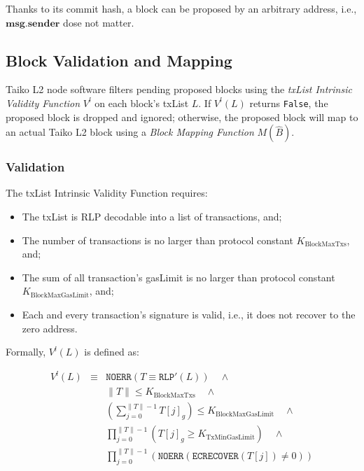 \documentclass[9pt,oneside]{amsart}
\begin{document}
\begin{multicols}{2}
Thanks to its commit hash, a block can be proposed by an arbitrary address, i.e., $\mathbf{msg.sender}$ dose not matter.

\subsection{Block Validation and Mapping } \label{sec:filtermap}
Taiko L2 node software filters pending proposed blocks using the \textit{txList Intrinsic Validity Function} $V^l$ on each block's txList $L$. If $V^l(L)$ returns \texttt{False}, the proposed block is dropped and ignored; otherwise, the proposed block will map to an actual Taiko L2 block using a \textit{Block Mapping Function} $M(\hat{B})$.

\subsubsection{Validation} The txList Intrinsic Validity Function requires:

\begin{itemize}
\item The txList is RLP decodable into a list of transactions, and;
\item The number of transactions is no larger than  protocol constant $ K_{\mathrm{BlockMaxTxs}}$, and;
\item The sum of all transaction's gasLimit is no larger than protocol constant $K_{\mathrm{BlockMaxGasLimit}}$, and;
\item Each and every transaction's signature is valid, i.e., it does not recover to the zero address.
\end{itemize}

Formally, $V^l(L)$ is defined as:


\begin{eqnarray}
V^l(L) & \equiv & \texttt{NOERR}(T \equiv \texttt{RLP}'(L))  \quad \wedge  \\
\nonumber& & \lVert T \rVert \le K_{\mathrm{BlockMaxTxs}} \quad \wedge \\
\nonumber & & (\sum_{j = 0}^{\lVert T \rVert - 1}T[j]_g) \le K_{\mathrm{BlockMaxGasLimit}} \quad \wedge \\
\nonumber & & \prod_{j = 0}^{\lVert T \rVert - 1} (T[j]_g \ge K_{\mathrm{TxMinGasLimit}})\quad \wedge \\
\nonumber & & \prod_{j = 0}^{\lVert T \rVert - 1} (\texttt{NOERR}(\texttt{ECRECOVER}(T[j]) \ne 0) )
\end{eqnarray}


\end{multicols}
\end{document}
